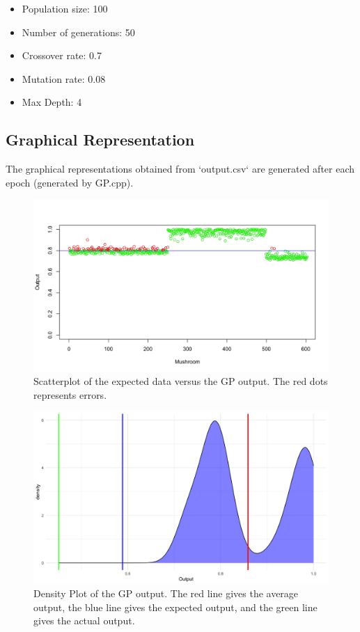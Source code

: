 \documentclass{article}
\begin{document}
\begin{itemize}
    \item Population size: 100
    \item Number of generations: 50
    \item Crossover rate: 0.7
    \item Mutation rate: 0.08
    \item Max Depth: 4
\end{itemize}

\subsection{Graphical Representation}
The graphical representations obtained from `output.csv` are generated after each epoch (generated by GP.cpp).
    \begin{figure}[H]
        \includegraphics[width=\linewidth]{GP_scatterplot.png}
        \caption{Scatterplot of the expected data versus the GP output. The red dots represents errors.}
        \label{fig:ils}
    \end{figure}

    \begin{figure}[H]
        \includegraphics[width=\linewidth]{GP_density.png}
        \caption{Density Plot of the GP output. The red line gives the average output, the blue line gives the expected output, and the green line gives the actual output.}
        \label{fig:sa}
    \end{figure}
\end{document}
